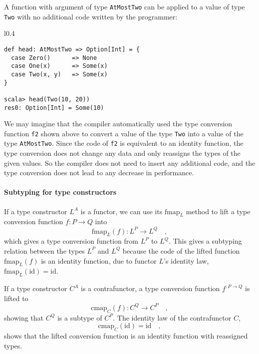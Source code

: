 A function with argument of type \lstinline!AtMostTwo! can be applied
to a value of type \lstinline!Two! with no additional code written
by the programmer:

\begin{wrapfigure}{l}{0.4\columnwidth}%
\vspace{-0.5\baselineskip}
\begin{lstlisting}
def head: AtMostTwo => Option[Int] = {
  case Zero()      => None
  case One(x)      => Some(x)
  case Two(x, y)   => Some(x)
}

scala> head(Two(10, 20))
res0: Option[Int] = Some(10)
\end{lstlisting}

\vspace{-1\baselineskip}
\end{wrapfigure}%
We may imagine that the compiler automatically used the type conversion
function \lstinline!f2! shown above to convert a value of the type
\lstinline!Two! into a value of the type \lstinline!AtMostTwo!.
Since the code of \lstinline!f2! is equivalent to an identity function,
the type conversion does not change any data and only reassigns the
types of the given values. So the compiler does not need to insert
any additional code, and the type conversion does not lead to any
decrease in performance.

\paragraph{Subtyping for type constructors}

If a type constructor $L^{A}$ is a functor, we can use its $\text{fmap}_{L}$
method to lift a type conversion function $f:P\rightarrow Q$ into
\[
\text{fmap}_{L}(f):L^{P}\rightarrow L^{Q}\quad,
\]
which gives a type conversion function from $L^{P}$ to $L^{Q}$.
This gives a subtyping relation between the types $L^{P}$ and $L^{Q}$
because the code of the lifted function $\text{fmap}_{L}(f)$ is an
identity function, due to functor $L$\textsf{'}s identity law, $\text{fmap}_{L}(\text{id})=\text{id}$. 

If a type constructor $C^{A}$ is a contrafunctor, a type conversion
function $f^{:P\rightarrow Q}$ is lifted to 
\[
\text{cmap}_{C}(f):C^{Q}\rightarrow C^{P}\quad,
\]
showing that $C^{Q}$ is a subtype of $C^{P}$. The identity law of
the contrafunctor $C$, 
\[
\text{cmap}_{C}(\text{id})=\text{id}\quad,
\]
shows that the lifted conversion function is an identity function
with reassigned types.

